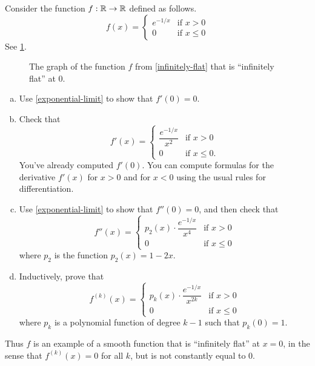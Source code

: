 \begin{exercise} \label{infinitely-flat}
	Consider the function $f : \mathbb{R} \to \mathbb{R}$ defined as follows.
	\[ f(x) = \begin{cases} e^{-1/x} & \text{if } x > 0 \\ 0 & \text{if } x \leq 0 \end{cases} \]
	See \cref{infinitely-flat-graph}. 
	\begin{figure}[ht]
		\begin{center}
		\end{center}
		\caption{The graph of the function $f$ from \cref{infinitely-flat} that is ``infinitely flat'' at 0.}  \label{infinitely-flat-graph}
	\end{figure}
	\begin{enumerate}[(a)]
		\item Use \cref{exponential-limit} to show that $f'(0) = 0$.
		\item Check that
		\[ f'(x) = \begin{cases} \dfrac{e^{-1/x}}{x^2} & \text{if } x > 0 \\ 0 & \text{if } x \leq 0. \end{cases} \]
		You've already computed $f'(0)$. You can compute formulas for the derivative $f'(x)$ for $x > 0$ and for $x < 0$ using the usual rules for differentiation.
		\item Use \cref{exponential-limit} to show that $f''(0) = 0$, and then check that 
		\[ f''(x) = \begin{cases} p_2(x) \cdot \dfrac{e^{-1/x}}{x^4} & \text{if } x > 0 \\ 0 & \text{if } x \leq 0 \end{cases} \]
		where $p_2$ is the function $p_2(x) = 1-2x$. 
		\item Inductively, prove that
		\[ f^{(k)}(x) = \begin{cases} p_k(x) \cdot \dfrac{e^{-1/x}}{x^{2k}} & \text{if } x > 0 \\ 0 & \text{if } x \leq 0 \end{cases} \]
		where $p_k$ is a polynomial function of degree $k-1$ such that $p_k(0) = 1$. 
	\end{enumerate}
	Thus $f$ is an example of a smooth function that is ``infinitely flat'' at $x = 0$, in the sense that $f^{(k)}(x) = 0$ for all $k$, but is not constantly equal to 0. 
\end{exercise}

